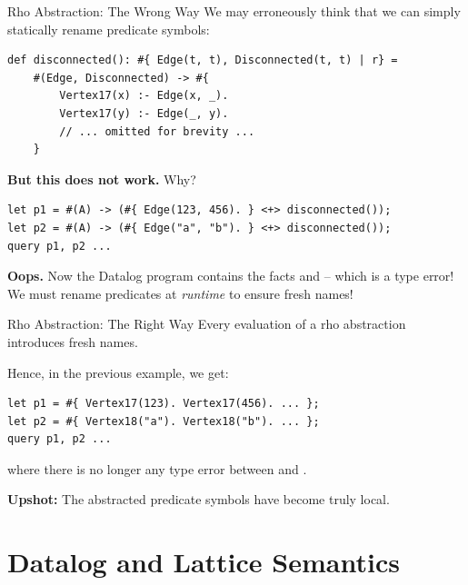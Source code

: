 \begin{frame}[fragile]{Rho Abstraction: The Wrong Way}
We may erroneously think that we can simply statically rename predicate symbols:

\begin{lstlisting}[language=flix, xleftmargin=0.8cm]
def disconnected(): #{ Edge(t, t), Disconnected(t, t) | r} = 
    #(Edge, Disconnected) -> #{
        Vertex17(x) :- Edge(x, _).
        Vertex17(y) :- Edge(_, y).
        // ... omitted for brevity ...
    }
\end{lstlisting}

\pause

\textbf{But this does not work.} Why?

\pause

\begin{lstlisting}[language=flix, xleftmargin=0.8cm]
let p1 = #(A) -> (#{ Edge(123, 456). } <+> disconnected());
let p2 = #(A) -> (#{ Edge("a", "b"). } <+> disconnected());
query p1, p2 ...
\end{lstlisting}

\textbf{Oops.} Now the Datalog program contains the facts 
and  -- which is a type error! We must rename predicates at
\emph{runtime} to ensure fresh names!
\end{frame}

\begin{frame}[fragile]{Rho Abstraction: The Right Way}
Every evaluation of a rho abstraction introduces fresh names.

Hence, in the previous example, we get:

\begin{lstlisting}[language=flix, xleftmargin=0.8cm]
let p1 = #{ Vertex17(123). Vertex17(456). ... };
let p2 = #{ Vertex18("a"). Vertex18("b"). ... };
query p1, p2 ...
\end{lstlisting}

where there is no longer any type error between  and .

\pause

\textbf{Upshot:} The abstracted predicate symbols have become truly local.
\end{frame}

\section{Datalog and Lattice Semantics}

